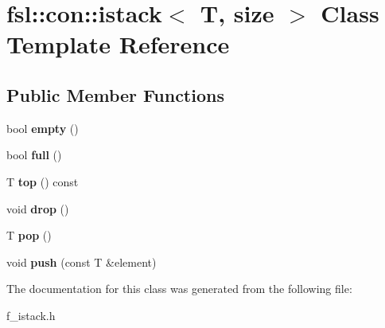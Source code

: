 \hypertarget{classfsl_1_1con_1_1istack}{}\section{fsl\+::con\+::istack$<$ T, size $>$ Class Template Reference}
\label{classfsl_1_1con_1_1istack}
\subsection*{Public Member Functions}
\begin{DoxyCompactItemize}
\item 
\mbox{\label{classfsl_1_1con_1_1istack_a2b765d6222aaf7da252de676abb859d2}} 
bool {\bfseries empty} ()
\item 
\mbox{\label{classfsl_1_1con_1_1istack_a9952371f4c05038d1cfc18d13bd72732}} 
bool {\bfseries full} ()
\item 
\mbox{\label{classfsl_1_1con_1_1istack_a16a5dec3c57d9e1cb8545ec69748968a}} 
T {\bfseries top} () const
\item 
\mbox{\label{classfsl_1_1con_1_1istack_a19fb389fa9b4505d2c9c136ce13b3433}} 
void {\bfseries drop} ()
\item 
\mbox{\label{classfsl_1_1con_1_1istack_a1168b3f39959d34f9958166efb378629}} 
T {\bfseries pop} ()
\item 
\mbox{\label{classfsl_1_1con_1_1istack_a5f425d980af934347c651f07db9d0879}} 
void {\bfseries push} (const T \&element)
\end{DoxyCompactItemize}


The documentation for this class was generated from the following file\+:\begin{DoxyCompactItemize}
\item 
f\+\_\+istack.\+h\end{DoxyCompactItemize}
